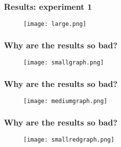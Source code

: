 \begin{frame}
\frametitle{Results: experiment 1}
\begin{figure}

	\texttt{[image: large.png]}

\end{figure}
\end{frame}

\begin{frame}
\frametitle{Why are the results so bad?}
\begin{figure}

	\texttt{[image: smallgraph.png]}

\end{figure}
\end{frame}

\begin{frame}
\frametitle{Why are the results so bad?}
\begin{figure}

	\texttt{[image: mediumgraph.png]}

\end{figure}
\end{frame}

\begin{frame}
\frametitle{Why are the results so bad?}
\begin{figure}

	\texttt{[image: smallredgraph.png]}

\end{figure}
\end{frame}

